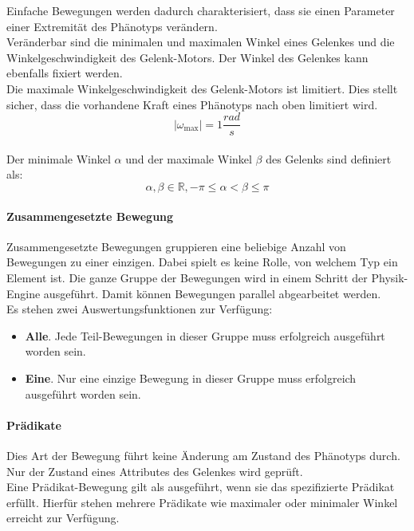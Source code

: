           Einfache Bewegungen werden dadurch charakterisiert,
          dass sie einen Parameter einer Extremität des Phänotyps verändern.
          \\
          Veränderbar sind die minimalen und maximalen Winkel eines Gelenkes und die Winkelgeschwindigkeit des
          Gelenk-Motors. Der Winkel des Gelenkes kann ebenfalls fixiert werden.
          \\
          Die maximale Winkelgeschwindigkeit des Gelenk-Motors ist limitiert.
          Dies stellt sicher, dass die vorhandene Kraft eines Phänotyps nach oben limitiert wird.
          \[ {\lvert} \omega_{\max} {\rvert} = 1\frac{rad}{s}\]
          \\
          Der minimale Winkel \(\alpha \) und der maximale Winkel \(\beta \) des Gelenks sind definiert als:
          \[ \alpha, \beta \in \mathbb{R}, -\pi \leq \alpha < \beta \leq \pi \]

        \paragraph{Zusammengesetzte Bewegung\label{EngineMovementsCompound}}

          Zusammengesetzte Bewegungen gruppieren eine beliebige Anzahl von Bewegungen zu einer einzigen.
          Dabei spielt es keine Rolle, von welchem Typ ein Element ist.
          Die ganze Gruppe der Bewegungen wird in einem Schritt der Physik-Engine ausgeführt.
          Damit können Bewegungen parallel abgearbeitet werden.
          \\
          Es stehen zwei Auswertungsfunktionen zur Verfügung:
          \begin{itemize}
            \item \textbf{Alle}. Jede Teil-Bewegungen in dieser Gruppe muss erfolgreich ausgeführt worden sein.
            \item \textbf{Eine}. Nur eine einzige Bewegung in dieser Gruppe muss erfolgreich ausgeführt worden sein.
          \end{itemize}

        \paragraph{Prädikate\label{EngineMovementsPredicates}}

          Dies Art der Bewegung führt keine Änderung am Zustand des Phänotyps durch.
          Nur der Zustand eines Attributes des Gelenkes wird geprüft.
          \\
          Eine Prädikat-Bewegung gilt als ausgeführt, wenn sie das spezifizierte Prädikat erfüllt.
          Hierfür stehen mehrere Prädikate wie maximaler oder minimaler Winkel erreicht zur Verfügung.

